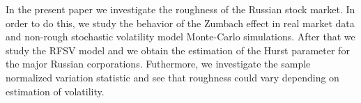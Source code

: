 In the present paper we investigate the roughness of the Russian stock market. 
In order to do this, we study the behavior of the Zumbach effect in real market data and 
non-rough stochastic volatility model Monte-Carlo simulations. After that we study the RFSV 
model and we obtain the estimation of the Hurst parameter for the 
major Russian corporations. Futhermore, we investigate the sample normalized variation statistic 
and see that roughness could vary depending on estimation of volatility.